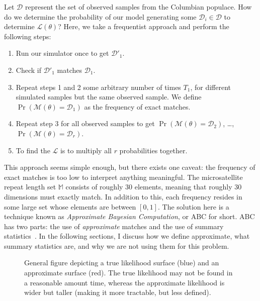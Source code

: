 Let $\mathcal{D}$ represent the set of observed samples from the Columbian populace.
How do we determine the probability of our model generating some $\mathcal{D}_i \in \mathcal{D}$ to
determine $\mathcal{L}(\theta)$?
Here, we take a frequentist approach and perform the following steps:
\begin{enumerate}
    \item Run our simulator once to get $\mathcal{D}'_1$.
    \item Check if $\mathcal{D}'_1$ matches $\mathcal{D}_1$.
    \item Repeat steps 1 and 2 some arbitrary number of times $T_1$, for different simulated samples but the same
        observed sample.
        We define $\Pr\left( \mathcal{M}(\theta) = \mathcal{D}_1 \right)$ as the frequency of exact matches.
    \item Repeat step 3 for all observed samples to get $\Pr\left( \mathcal{M}(\theta) = \mathcal{D}_2 \right)$,
        \ldots, $\Pr\left( \mathcal{M}(\theta) = \mathcal{D}_r \right)$.
    \item To find the $\mathcal{L}$ is to multiply all $r$ probabilities together.
\end{enumerate}

This approach seems simple enough, but there exists one caveat: the frequency of exact matches is too low to interpret
anything meaningful.
The microsatellite repeat length set $\mathbb{M}$ consists of roughly 30 elements, meaning that roughly 30 dimensions
must exactly match.
In addition to this, each frequency resides in some large set whose elements are between $[0, 1]$.
The solution here is a technique known as \emph{Approximate Bayesian Computation}, or ABC for short.
ABC has two parts: the use of \emph{approximate} matches and the use of summary
statistics~\cite{lintusaariFundamentalsRecentDevelopments2017}.
In the following sections, I discuss how we define approximate, what summary statistics are, and why we are not using
them for this problem.

\begin{figure}[t]
    \centering{}
    \caption{General figure depicting a true likelihood surface (blue) and an approximate surface (red).
    The true likelihood may not be found in a reasonable amount time, whereas the approximate likelihood is wider but
    taller (making it more tractable, but less defined).
    }\label{fig:approximateLikelihood}
\end{figure}

